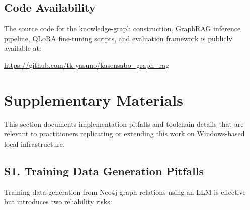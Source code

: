\documentclass[twocolumn]{article}
\begin{document}

\subsection*{Code Availability}

The source code for the knowledge-graph construction, GraphRAG inference pipeline,
QLoRA fine-tuning scripts, and evaluation framework is publicly available at:

\begin{center}
  {\small\url{https://github.com/tk-yasuno/kasensabo_graph_rag}}
\end{center}





\section*{Supplementary Materials}
\label{sec:supplementary}

This section documents implementation pitfalls and toolchain details that are
relevant to practitioners replicating or extending this work on Windows-based
local infrastructure.

\subsection*{S1. Training Data Generation Pitfalls}

Training data generation from Neo4j graph relations using an LLM is effective but introduces
two reliability risks:
\end{document}
